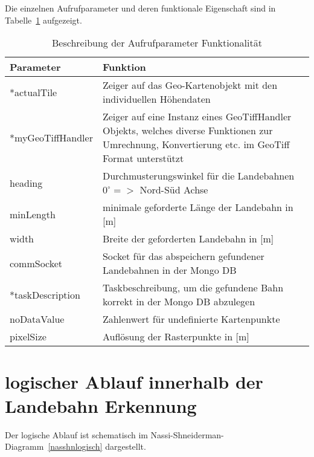 \documentclass[10pt,a4paper]{report}
\begin{document}
Die einzelnen Aufrufparameter und deren funktionale Eigenschaft sind in Tabelle~\ref{beschreibungparameter} aufgezeigt.

\begin{table}[htb]
\centering
\begin{tabular}{|p{4.5cm}|p{10cm}|}
\hline 
\bf{Parameter} & \bf{Funktion} \\ 
\hline 
*actualTile & Zeiger auf das Geo-Kartenobjekt mit den individuellen Höhendaten \\ 
\hline 
*myGeoTiffHandler & Zeiger auf eine Instanz eines GeoTiffHandler Objekts, 
welches diverse Funktionen zur Umrechnung, Konvertierung etc. im GeoTiff Format unterstützt \\ 
\hline 
heading & Durchmusterungswinkel für die Landebahnen $0^\circ =>$ Nord-Süd Achse \\ 
\hline 
minLength & minimale geforderte Länge der Landebahn in [m] \\ 
\hline 
width & Breite der geforderten Landebahn in [m] \\ 
\hline 
commSocket & Socket für das abspeichern gefundener Landebahnen in der Mongo DB\\ 
\hline 
*taskDescription & Taskbeschreibung, um die gefundene Bahn korrekt in der Mongo DB abzulegen \\ 
\hline 
noDataValue & Zahlenwert für undefinierte Kartenpunkte \\ 
\hline 
pixelSize & Auflösung der Rasterpunkte in [m]\\
\hline 

\end{tabular} 
\caption{Beschreibung der Aufrufparameter Funktionalität}\label{beschreibungparameter}
\end{table}

\section{logischer Ablauf innerhalb der Landebahn Erkennung}

Der logische Ablauf ist schematisch im Nassi-Shneiderman-Diagramm~\ref{nasshnlogisch} dargestellt.
\end{document}
